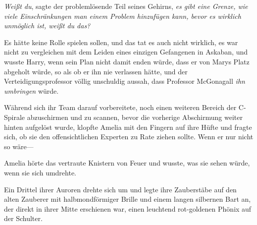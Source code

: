 \emph{Weißt du}, sagte der problemlösende Teil seines Gehirns, \emph{es gibt eine Grenze, wie viele Einschränkungen man einem Problem hinzufügen kann, bevor es wirklich unmöglich ist, weißt du das?}

Es hätte keine Rolle spielen sollen, und das tat es auch nicht wirklich, es war nicht zu vergleichen mit dem Leiden eines einzigen Gefangenen in Askaban, und wusste Harry, wenn sein Plan nicht damit enden würde, dass er von Marys Platz abgeholt würde, so als ob er ihn nie verlassen hätte, und der Verteidigungsprofessor völlig unschuldig aussah, dass Professor McGonagall \emph{ihn umbringen} würde.

\later

Während sich ihr Team darauf vorbereitete, noch einen weiteren Bereich der C-Spirale abzuschirmen und zu scannen, bevor die vorherige Abschirmung weiter hinten aufgelöst wurde, klopfte Amelia mit den Fingern auf ihre Hüfte und fragte sich, ob sie den offensichtlichen Experten zu Rate ziehen sollte. Wenn er nur nicht so wäre—

Amelia hörte das vertraute Knistern von Feuer und wusste, was sie sehen würde, wenn sie sich umdrehte.

Ein Drittel ihrer Auroren drehte sich um und legte ihre Zauberstäbe auf den alten Zauberer mit halbmondförmiger Brille und einem langen silbernen Bart an, der direkt in ihrer Mitte erschienen war, einen leuchtend rot-goldenen Phönix auf der Schulter.

